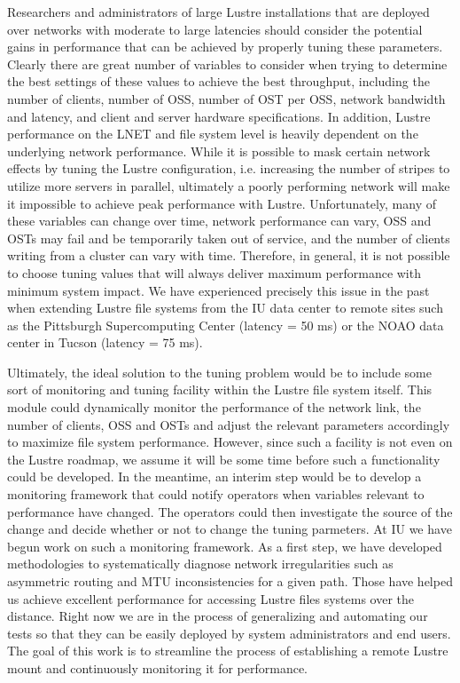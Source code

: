 \documentclass[]{sigplan-proc}
\begin{document}
Researchers and administrators of large Lustre installations that are deployed over networks with moderate to
large latencies should consider the potential gains in performance that can be achieved by properly tuning
these parameters. Clearly there are great number of variables to consider when trying to determine the best
settings of these values to achieve the best throughput, including the number of clients, number of OSS,
number of OST per OSS, network bandwidth and latency, and client and server hardware specifications. In
addition, Lustre performance on the LNET and file system level is heavily dependent on the underlying network
performance. While it is possible to mask certain network effects by tuning the Lustre configuration,
i.e. increasing the number of stripes to utilize more servers in parallel, ultimately a poorly performing
network will make it impossible to achieve peak performance with Lustre. Unfortunately, many of these
variables can change over time, network performance can vary, OSS and OSTs may fail and be temporarily taken
out of service, and the number of clients writing from a cluster can vary with time. Therefore, in general, it
is not possible to choose tuning values that will always deliver maximum performance with minimum system
impact. We have experienced precisely this issue in the past when extending Lustre file systems from the IU
data center to remote sites such as the Pittsburgh Supercomputing Center (latency = 50 ms) or the NOAO data
center in Tucson (latency = 75 ms).

Ultimately, the ideal solution to the tuning problem would be to include some sort of monitoring and tuning
facility within the Lustre file system itself. This module could dynamically monitor the performance of the
network link, the number of clients, OSS and OSTs and adjust the relevant parameters accordingly to maximize
file system performance. However, since such a facility is not even on the Lustre roadmap, we assume it will
be some time before such a functionality could be developed. In the meantime, an interim step would be to
develop a monitoring framework that could notify operators when variables relevant to performance have
changed. The operators could then investigate the source of the change and decide whether or not to change the
tuning parmeters. At IU we have begun work on such a monitoring framework. As a first step, we have developed
methodologies to systematically diagnose network irregularities such as asymmetric routing and MTU
inconsistencies for a given path. Those have helped us achieve excellent performance for accessing Lustre
files systems over the distance. Right now we are in the process of generalizing and automating our tests so
that they can be easily deployed by system administrators and end users. The goal of this work is to
streamline the process of establishing a remote Lustre mount and continuously monitoring it for performance.
  
\end{document}
